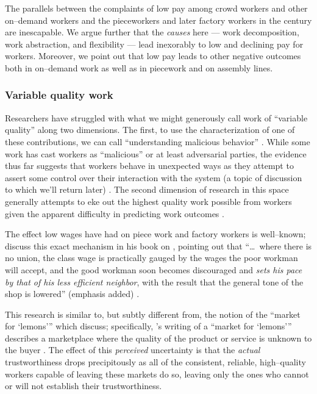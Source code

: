 \documentclass{sigchi}
\begin{document}
The parallels between the complaints of low pay among crowd workers and other on--demand workers
and the pieceworkers and later factory workers in the  century
are inescapable.
We argue further that the \textit{causes} here
--- work decomposition,
work abstraction, and
flexibility ---
lead inexorably to low and declining pay for workers.
Moreover, we point out that low pay leads to other negative outcomes both
in on--demand work
as well as
in piecework and on assembly lines.

\subsubsection{Variable quality work}\label{sec:varQualWork}
Researchers have struggled with what we might generously call work of ``variable quality''
along two dimensions.
The first, to use the characterization of one of these contributions, we can call
``understanding malicious behavior''
\cite{MaliciousCrowdworkersGadiraju}.
While some work has cast workers as ``malicious'' or at least adversarial parties,
the evidence thus far suggests that
workers behave in unexpected ways as they attempt to assert some control over their interaction with the system
(a topic of discussion to which we'll return later)
\cite{uberAlgorithm}.
The second dimension of research in this space generally attempts
to eke out the highest quality work possible from workers
given the apparent difficulty in predicting work outcomes
\cite{embracingErrorKrishna}.






The effect low wages have had on piece work and factory workers is well--known;
\citeauthor{gantt1913work} discuss this exact mechanism in his book on
, pointing out that
``\dots~where there is no union,
the class wage is practically gauged by the wages the poor workman will accept,
and the good workman soon becomes discouraged and \textit{sets his pace by that of his less efficient neighbor},
with the result that the general tone of the shop is lowered'' (emphasis added)
\cite{gantt1913work}.

This research is similar to, but subtly different from, the notion of the ``market for `lemons'''
which \citeauthor{fort2011amazon} discuss;
specifically, \citeauthor{akerlof1970market}'s writing of a ``market for `lemons'''
describes a marketplace where the quality of the product or service is unknown to the buyer
\cite{fort2011amazon,akerlof1970market}.
The effect of this \textit{perceived} uncertainty is that
the \textit{actual} trustworthiness drops precipitously
as all of the consistent, reliable, high--quality workers capable of leaving these markets do so,
leaving only the ones who cannot or will not establish their trustworthiness.
\end{document}

